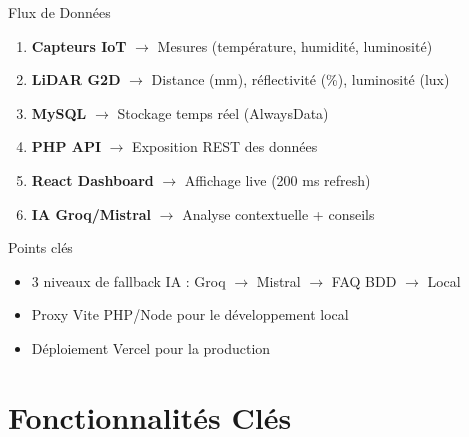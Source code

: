 \documentclass[11pt,aspectratio=169]{beamer}
\begin{document}
\begin{frame}{Flux de Donn\'ees}
  \begin{enumerate}
    \item \textbf{Capteurs IoT} $\rightarrow$ Mesures (temp\'erature, humidit\'e, luminosit\'e)
    \item \textbf{LiDAR G2D} $\rightarrow$ Distance (mm), r\'eflectivit\'e (\%), luminosit\'e (lux)
    \item \textbf{MySQL} $\rightarrow$ Stockage temps r\'eel (AlwaysData)
    \item \textbf{PHP API} $\rightarrow$ Exposition REST des donn\'ees
    \item \textbf{React Dashboard} $\rightarrow$ Affichage live (200 ms refresh)
    \item \textbf{IA Groq/Mistral} $\rightarrow$ Analyse contextuelle + conseils
  \end{enumerate}

  \vspace{0.3cm}
  \begin{block}{Points cl\'es}
    \begin{itemize}
      \item 3 niveaux de fallback IA : Groq $\rightarrow$ Mistral $\rightarrow$ FAQ BDD $\rightarrow$ Local
      \item Proxy Vite PHP/Node pour le d\'eveloppement local
      \item D\'eploiement Vercel pour la production
    \end{itemize}
  \end{block}
\end{frame}

\section{Fonctionnalit\'es Cl\'es}
\end{document}
